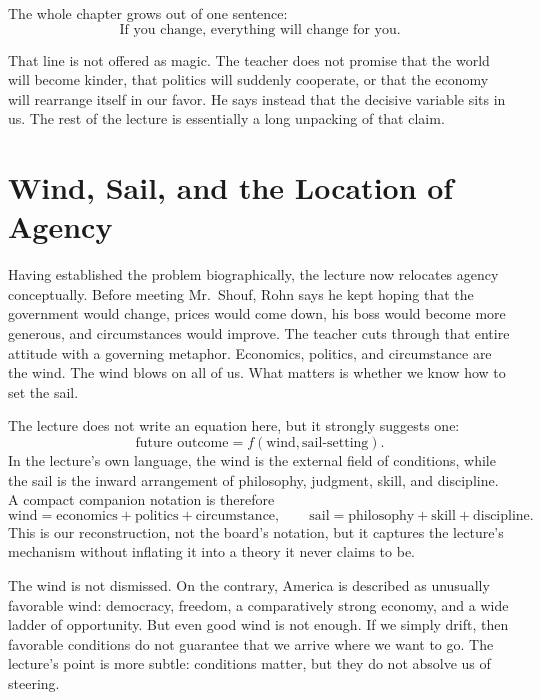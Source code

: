 The whole chapter grows out of one sentence:
\begin{equation}
\text{If you change, everything will change for you.}
\end{equation}

That line is not offered as magic. The teacher does not promise that the world will become kinder, that politics will suddenly cooperate, or that the economy will rearrange itself in our favor. He says instead that the decisive variable sits in us. The rest of the lecture is essentially a long unpacking of that claim.

\section{Wind, Sail, and the Location of Agency}

Having established the problem biographically, the lecture now relocates agency conceptually. Before meeting Mr.~Shouf, Rohn says he kept hoping that the government would change, prices would come down, his boss would become more generous, and circumstances would improve. The teacher cuts through that entire attitude with a governing metaphor. Economics, politics, and circumstance are the wind. The wind blows on all of us. What matters is whether we know how to set the sail.

The lecture does not write an equation here, but it strongly suggests one:
\begin{equation}
\text{future outcome} = f(\text{wind},\text{sail-setting}).
\end{equation}
In the lecture's own language, the wind is the external field of conditions, while the sail is the inward arrangement of philosophy, judgment, skill, and discipline. A compact companion notation is therefore
\begin{equation}
\text{wind} = \text{economics}+\text{politics}+\text{circumstance}, \qquad
\text{sail} = \text{philosophy}+\text{skill}+\text{discipline}.
\end{equation}
This is our reconstruction, not the board's notation, but it captures the lecture's mechanism without inflating it into a theory it never claims to be.

The wind is not dismissed. On the contrary, America is described as unusually favorable wind: democracy, freedom, a comparatively strong economy, and a wide ladder of opportunity. But even good wind is not enough. If we simply drift, then favorable conditions do not guarantee that we arrive where we want to go. The lecture's point is more subtle: conditions matter, but they do not absolve us of steering.

